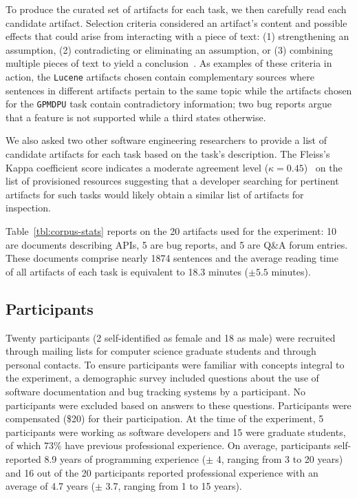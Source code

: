 To produce the curated set of artifacts for each task, we then carefully read each candidate artifact.
Selection criteria considered an artifact's content and possible effects that 
could arise from interacting with a piece of text:
(1) strengthening an assumption, (2) contradicting or eliminating an assumption, or 
(3) combining multiple pieces of text to yield a conclusion~\cite{clark2013relevance}.
As examples of these criteria in action, the \texttt{Lucene}
artifacts chosen contain
complementary sources where sentences in different artifacts
pertain to the same topic
while the artifacts chosen for
the \texttt{GPMDPU} task contain contradictory information; two bug reports
argue that a feature is not supported while a third states otherwise.

We also asked two other software engineering researchers to provide a
list of candidate artifacts for each task based on the task's
description.  The Fleiss's Kappa coefficient score indicates a
moderate agreement level ($\kappa = 0.45$)~\cite{fleisskappa1977,
fleiss1981} on the list of provisioned resources suggesting that a
developer searching for pertinent artifacts for such tasks would
likely obtain a similar list of artifacts for inspection.



Table~\ref{tbl:corpus-stats} reports on the 20 artifacts used for the
experiment: 10 are documents describing APIs, 5 are bug reports, and 5
are Q\&A forum entries. These documents comprise nearly 1874
sentences and the average reading time~\cite{Just1980} of all artifacts of each task
is equivalent to 18.3 minutes ($\pm 5.5$ minutes). 








\subsection{Participants}
\label{cp3:method-participants}


Twenty participants (2 self-identified as female and 18 as male) were recruited through
mailing lists for computer science graduate students 
and through personal contacts. To ensure participants were
familiar with concepts integral to the experiment, a demographic
survey included questions about the use of software documentation and
bug tracking systems by a participant.  No participants were excluded
based on answers to these questions.
Participants were compensated (\$20) for their participation.
At the time of the experiment, 5 participants were working as software
developers and 15 were graduate
students, of which 73\% have
previous professional experience. 
On average, participants self-reported 8.9 years of
programming experience ({\small $\pm$} 4, ranging from 3 to 20 years)
and 16 out of the 20 participants reported professional experience with an average of 4.7 years ({\small $\pm$}
3.7, ranging from 1 to 15 years).



